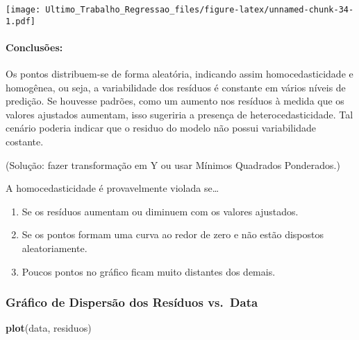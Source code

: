 \documentclass[
]{article}
\newenvironment{Shaded}{\begin{snugshade}}{\end{snugshade}}
\newcommand{\FunctionTok}[1]{\textcolor[rgb]{0.13,0.29,0.53}{\textbf{#1}}}
\newcommand{\NormalTok}[1]{#1}
\newcommand{\SpecialCharTok}[1]{\textcolor[rgb]{0.81,0.36,0.00}{\textbf{#1}}}
\providecommand{\tightlist}{%
  \setlength{\itemsep}{0pt}\setlength{\parskip}{0pt}}
\begin{document}
\begin{Shaded}
\end{Shaded}

\texttt{[image: Ultimo\_Trabalho\_Regressao\_files/figure-latex/unnamed-chunk-34-1.pdf]}

\hypertarget{conclusuxf5es}{%
\paragraph{Conclusões:}\label{conclusuxf5es}}

Os pontos distribuem-se de forma aleatória, indicando assim
homocedasticidade e homogênea, ou seja, a variabilidade dos resíduos é
constante em vários níveis de predição. Se houvesse padrões, como um
aumento nos resíduos à medida que os valores ajustados aumentam, isso
sugeriria a presença de heterocedasticidade. Tal cenário poderia indicar
que o residuo do modelo não possui variabilidade costante.

(Solução: fazer transformação em Y ou usar Mínimos Quadrados
Ponderados.)

A homocedasticidade é provavelmente violada se\ldots{}

\begin{enumerate}
\def\labelenumi{\arabic{enumi}.}
\tightlist
\item
  Se os resíduos aumentam ou diminuem com os valores ajustados.
\item
  Se os pontos formam uma curva ao redor de zero e não estão dispostos
  aleatoriamente.
\item
  Poucos pontos no gráfico ficam muito distantes dos demais.
\end{enumerate}

\hypertarget{gruxe1fico-de-dispersuxe3o-dos-resuxedduos-vs.-data}{%
\subsubsection{Gráfico de Dispersão dos Resíduos
vs.~Data}\label{gruxe1fico-de-dispersuxe3o-dos-resuxedduos-vs.-data}}

\begin{Shaded}
\begin{Highlighting}[]
\FunctionTok{plot}\NormalTok{(data, residuos)}
\end{Highlighting}
\end{Shaded}
\end{document}
